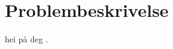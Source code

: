 \section{Problembeskrivelse}
\label{problemBeskrivelse}


hei på deg \cite{floyd2008electronic}.
\lipsum[1-2]
